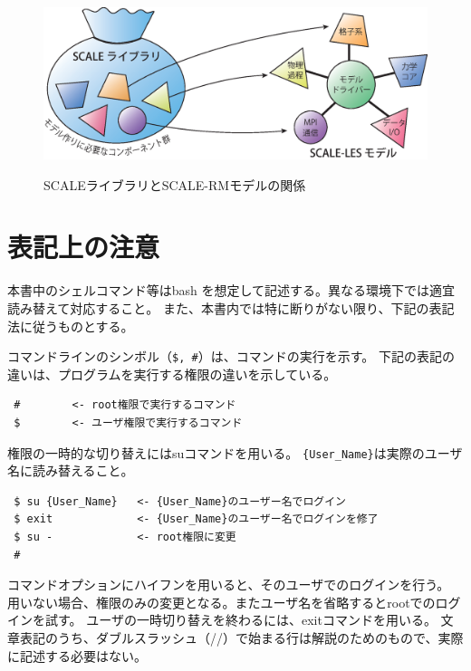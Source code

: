\begin{figure}[tb]
\begin{center}
  \includegraphics[width=0.9\hsize]{./figure/scale.eps}\\
  \caption{SCALEライブラリとSCALE-RMモデルの関係}
  \label{fig:scale-rm}
\end{center}
\end{figure}


\section{表記上の注意}

本書中のシェルコマンド等はbash を想定して記述する。異なる環境下では適宜読み替えて対応すること。
また、本書内では特に断りがない限り、下記の表記法に従うものとする。


コマンドラインのシンボル（\verb|$, #|）は、コマンドの実行を示す。
下記の表記の違いは、プログラムを実行する権限の違いを示している。

\begin{verbatim}
 #        <- root権限で実行するコマンド
 $        <- ユーザ権限で実行するコマンド
\end{verbatim}
権限の一時的な切り替えにはsuコマンドを用いる。
\verb|{User_Name}|は実際のユーザ名に読み替えること。
\begin{verbatim}
 $ su {User_Name}   <- {User_Name}のユーザー名でログイン
 $ exit             <- {User_Name}のユーザー名でログインを修了
 $ su -             <- root権限に変更
 #
\end{verbatim}

コマンドオプションにハイフンを用いると、そのユーザでのログインを行う。
用いない場合、権限のみの変更となる。またユーザ名を省略するとrootでのログインを試す。
ユーザの一時切り替えを終わるには、exitコマンドを用いる。
文章表記のうち、ダブルスラッシュ（//）で始まる行は解説のためのもので、実際に記述する必要はない。

